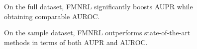 \documentclass[sigconf,anonymous]{acmart}
\begin{document}
\begin{figure}[!ht]
\centering
{}
\vspace*{-10pt}
\caption{On the full dataset, FMNRL significantly boosts AUPR while obtaining comparable AUROC.}\label{fig:full}
\end{figure}

\begin{figure}[!ht]
\centering
{}
\vspace*{-10pt}
\caption{On the sample dataset, FMNRL outperforms state-of-the-art methods in terms of both AUPR and AUROC.}\label{fig:sample}

\end{figure}
\end{document}
